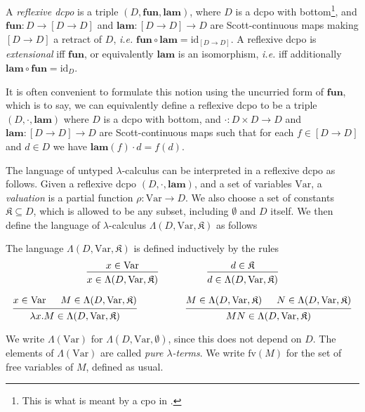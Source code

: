 \documentclass{lmcs}
\newcommand{\Var}{\ensuremath{\mathrm{Var}}}
\newcommand{\id}{\ensuremath{\mathrm{id}}}
\newcommand{\scottcon}[2]{{[#1 \rightarrow #2]}}
\newcommand{\fv}{\mathrm{fv}}
\newcommand{\fun}{\mathbf{fun}}
\newcommand{\lam}{\mathbf{lam}}
\newcommand{\Const}{\mathfrak{K}}
\begin{document}

\begin{defi}
	\label{ReflexiveDcpoDef}
	A \emph{reflexive dcpo} %
	is a triple $(D,\fun,\lam)$, where $D$ is a dcpo with bottom\footnote{This is what is meant by a cpo in \cite[Definition 1.2.1 (ii)]{barendregt84}.}, and $\fun : D \rightarrow \scottcon{D}{D}$ and $\lam : \scottcon{D}{D} \rightarrow D$ are Scott-continuous maps making $\scottcon{D}{D}$ a retract of $D$, \emph{i.e.} $\fun \circ \lam = \id_{\scottcon{D}{D}}$. A reflexive dcpo is \emph{extensional} iff $\fun$, or equivalently $\lam$ is an isomorphism, \emph{i.e.} iff additionally $\lam \circ \fun = \id_D$. \qedhere
\end{defi}
It is often convenient to formulate this notion using the uncurried form of $\fun$, which is to say, we can equivalently define a reflexive dcpo to be a triple $(D,\cdot, \lam)$ where $D$ is a dcpo with bottom, and $\cdot : D \times D \rightarrow D$ and $\lam : \scottcon{D}{D} \rightarrow D$ are Scott-continuous maps such that for each $f \in \scottcon{D}{D}$ and $d \in D$ we have $\lam(f) \cdot d = f(d)$. 

The language of untyped $\lambda$-calculus can be interpreted in a reflexive dcpo as follows. Given a reflexive dcpo $(D,\cdot,\lam)$, and a set of variables $\Var$, a \emph{valuation} %
is a partial function $\rho : \Var \rightarrow D$. We also choose a set of constants $\Const \subseteq D$, which is allowed to be any subset, including $\emptyset$ and $D$ itself. We then define the language of $\lambda$-calculus $\Lambda(D,\Var,\Const)$ as follows
\begin{defi}
	\label{LambdaCalcLangDef}
	The language $\Lambda(D,\Var,\Const)$ is defined inductively by the rules 
	\[
	\begin{prooftree}
		\hypo{x \in \Var}
		\infer1{x \in \Lambda(D,\Var,\Const)}
	\end{prooftree}\quad~~~~~~~~~~~~
	\begin{prooftree}
		\hypo{d \in \Const}
		\infer1{d \in \Lambda(D,\Var,\Const)}
	\end{prooftree}
	\]
	
	\[
	\begin{prooftree}
		\hypo{x \in \Var}\hypo{M \in \Lambda(D,\Var,\Const)}
		\infer2{\lambda x . M \in \Lambda(D,\Var,\Const)}
	\end{prooftree}\quad~~~~~~~~~~~~
	\begin{prooftree}
		\hypo{M \in \Lambda(D,\Var,\Const)}\hypo{N \in \Lambda(D,\Var,\Const)}
		\infer2{MN \in \Lambda(D,\Var,\Const)}
	\end{prooftree}
	\]
\qedhere
\end{defi}
We write $\Lambda(\Var)$ for $\Lambda(D,\Var,\emptyset)$, since this does not depend on $D$. The elements of $\Lambda(\Var)$ are called \emph{pure $\lambda$-terms}. We write $\fv(M)$ for the set of free variables of $M$, defined as usual. 
\end{document}
